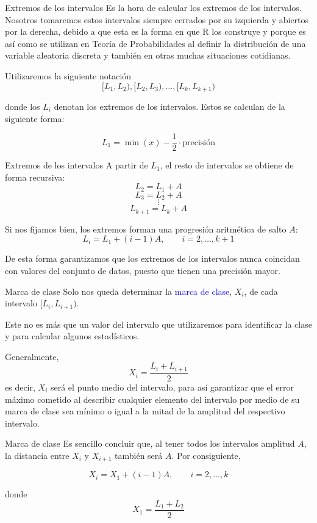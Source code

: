 \documentclass[
  ignorenonframetext,
  aspectratio=169]{beamer}
\newcommand\blue[1]{\textcolor{blue}{#1}}
\begin{document}
\begin{frame}{Extremos de los intervalos}
\protect\hypertarget{extremos-de-los-intervalos}{}
Es la hora de calcular los extremos de los intervalos. Nosotros
tomaremos estos intervalos siempre cerrados por su izquierda y abiertos
por la derecha, debido a que esta es la forma en que R los construye y
porque es así como se utilizan en Teoría de Probabilidades al definir la
distribución de una variable aleatoria discreta y también en otras
muchas situaciones cotidianas.

Utilizaremos la siguiente notación
\[[L_1,L_2),[L_2,L_3),\dots,[L_k,L_{k+1})\]

donde los \(L_i\) denotan los extremos de los intervalos. Estos se
calculan de la siguiente forma:

\[L_1 = \min(x)-\frac{1}{2}\cdot \text{precisión}\]
\end{frame}

\begin{frame}{Extremos de los intervalos}
\protect\hypertarget{extremos-de-los-intervalos-1}{}
A partir de \(L_1\), el resto de intervalos se obtiene de forma
recursiva: \[L_2 = L_1 + A\] \[L_3 = L_2 + A\] \[\vdots\]
\[L_{k+1} = L_k+A\]

Si nos fijamos bien, los extremos forman una progresión aritmética de
salto \(A\): \[L_{i} = L_{1}+(i-1)A,\qquad i=2,\dots,k+1\]

De esta forma garantizamos que los extremos de los intervalos nunca
coincidan con valores del conjunto de datos, puesto que tienen una
precisión mayor.
\end{frame}

\begin{frame}{Marca de clase}
\protect\hypertarget{marca-de-clase}{}
Solo nos queda determinar la \blue{marca de clase}, \(X_i\), de cada
intervalo \([L_i,L_{i+1})\).

Este no es más que un valor del intervalo que utilizaremos para
identificar la clase y para calcular algunos estadísticos.

Generalmente, \[X_i = \frac{L_i+L_{i+1}}{2}\] es decir, \(X_i\) será el
punto medio del intervalo, para así garantizar que el error máximo
cometido al describir cualquier elemento del intervalo por medio de su
marca de clase sea mínimo o igual a la mitad de la amplitud del
respectivo intervalo.
\end{frame}

\begin{frame}{Marca de clase}
\protect\hypertarget{marca-de-clase-1}{}
Es sencillo concluir que, al tener todos los intervalos amplitud \(A\),
la distancia entre \(X_i\) y \(X_{i+1}\) también será \(A\). Por
consiguiente,

\[X_{i} = X_1+ (i-1)A,\qquad i=2,\dots,k\]

donde \[X_1 = \frac{L_1+L_2}{2}\]
\end{frame}
\end{document}
